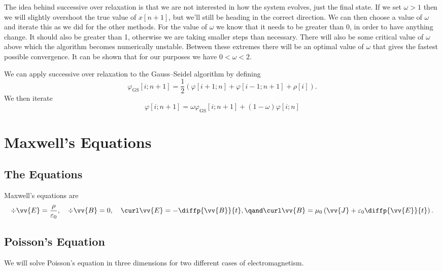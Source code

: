 \documentclass[fleqn]{NotesClass}
\begin{document}
    The idea behind successive over relaxation is that we are not interested in how the system evolves, just the final state.
    If we set \(\omega > 1\) then we will slightly overshoot the true value of \(x[n + 1]\), but we'll still be heading in the correct direction.
    We can then choose a value of \(\omega\) and iterate this as we did for the other methods.
    For the value of \(\omega\) we know that it needs to be greater than \(0\), in order to have anything change.
    It should also be greater than 1, otherwise we are taking smaller steps than necessary.
    There will also be some critical value of \(\omega\) above which the algorithm becomes numerically unstable.
    Between these extremes there will be an optimal value of \(\omega\) that gives the fastest possible convergence.
    It can be shown that for our purposes we have \(0 < \omega < 2\).
    
    We can apply successive over relaxation to the Gauss--Seidel algorithm by defining
    \begin{equation}
        \varphi_{\mathrm{GS}}[i; n + 1] = \frac{1}{2}(\varphi[i + 1; n] + \varphi[i - 1; n + 1] + \rho[i]).
    \end{equation}
    We then iterate
    \begin{equation}
        \varphi[i; n + 1] = \omega \varphi_{\mathrm{GS}}[i; n + 1] + (1 - \omega)\varphi[i; n]
    \end{equation}
    
    \chapter{Maxwell's Equations}
    \section{The Equations}
    Maxwell's equations are
    \begin{equation*}
        \div\vv{E} = \frac{\rho}{\varepsilon_0}, \quad \div\vv{B} = 0, \quad \curl\vv{E} = -\diffp{\vv{B}}{t}, \qand \curl\vv{B} = \mu_0\left( \vv{J} + \varepsilon_0\diffp{\vv{E}}{t} \right).
    \end{equation*}
    
    \section{Poisson's Equation}
    We will solve Poisson's equation in three dimensions for two different cases of electromagnetism.
    
\end{document}
